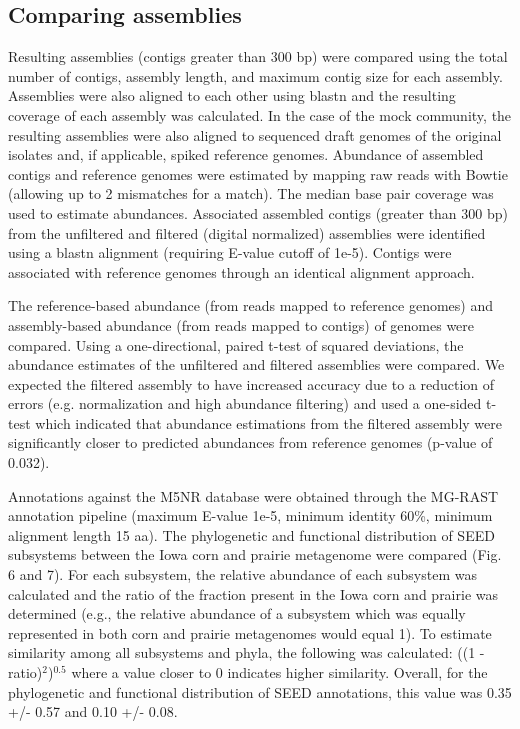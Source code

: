 \documentclass[11pt]{article} %
\begin{document}
\subsection{Comparing assemblies}
Resulting assemblies (contigs greater than 300 bp) were compared using
the total number of contigs, assembly length, and maximum contig size
for each assembly.  Assemblies were also aligned to each other using
blastn and the resulting coverage of each assembly was calculated.  In
the case of the mock community, the resulting assemblies were also
aligned to sequenced draft genomes of the original isolates and, if
applicable, spiked reference genomes. Abundance of assembled contigs
and reference genomes were estimated by mapping raw reads with Bowtie
(allowing up to 2 mismatches for a match).  The median base pair
coverage was used to estimate abundances.  Associated assembled
contigs (greater than 300 bp) from the unfiltered and filtered
(digital normalized) assemblies were identified using a blastn
alignment (requiring E-value cutoff of 1e-5).  Contigs were associated
with reference genomes through an identical alignment approach.

The reference-based abundance (from reads mapped to reference genomes)
and assembly-based abundance (from reads mapped to contigs) of genomes
were compared.  Using a one-directional, paired t-test of squared
deviations, the abundance estimates of the unfiltered and filtered
assemblies were compared.  We expected the filtered assembly to have
increased accuracy due to a reduction of errors (e.g. normalization
and high abundance filtering) and used a one-sided t-test which
indicated that abundance estimations from the filtered assembly were
significantly closer to predicted abundances from reference genomes
(p-value of 0.032).

Annotations against the M5NR database were obtained through the
MG-RAST annotation pipeline (maximum E-value 1e-5, minimum identity 60\%, minimum alignment length 15 aa). The phylogenetic and functional
distribution of SEED subsystems between the Iowa corn and prairie
metagenome were compared (Fig. 6 and 7).  For each subsystem, the
relative abundance of each subsystem was calculated and the ratio of
the fraction present in the Iowa corn and prairie was determined
(e.g., the relative abundance of a subsystem which was equally
represented in both corn and prairie metagenomes would equal 1).  To
estimate similarity among all subsystems and phyla, the following was
calculated: ((1 - ratio)$^2$)$^{0.5}$ where a value closer to 0
indicates higher similarity.  Overall, for the phylogenetic and
functional distribution of SEED annotations, this value was 0.35 +/-
0.57 and 0.10 +/- 0.08.
\end{document}
